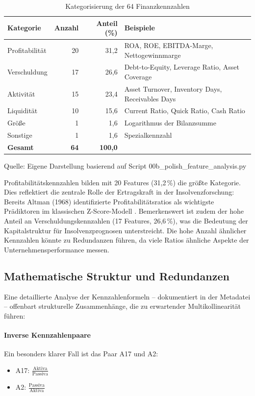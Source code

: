 \begin{table}[htbp]
\centering
\caption{Kategorisierung der 64 Finanzkennzahlen}
\label{tab:kategorien}
\begin{tabular}{lrrp{6cm}}
\toprule
\textbf{Kategorie} & \textbf{Anzahl} & \textbf{Anteil (\%)} & \textbf{Beispiele} \\
\midrule
Profitabilität & 20 & 31,2 & ROA, ROE, EBITDA-Marge, Nettogewinnmarge \\
Verschuldung & 17 & 26,6 & Debt-to-Equity, Leverage Ratio, Asset Coverage \\
Aktivität & 15 & 23,4 & Asset Turnover, Inventory Days, Receivables Days \\
Liquidität & 10 & 15,6 & Current Ratio, Quick Ratio, Cash Ratio \\
Größe & 1 & 1,6 & Logarithmus der Bilanzsumme \\
Sonstige & 1 & 1,6 & Spezialkennzahl \\
\midrule
\textbf{Gesamt} & \textbf{64} & \textbf{100,0} & \\
\bottomrule
\end{tabular}
\par\smallskip
{\footnotesize Quelle: Eigene Darstellung basierend auf Script 00b\_polish\_feature\_analysis.py}
\end{table}

Profitabilitätskennzahlen bilden mit 20 Features (31,2\,\%) die größte Kategorie. Dies reflektiert die zentrale Rolle der Ertragskraft in der Insolvenzforschung: Bereits Altman (1968) identifizierte Profitabilitätsratios als wichtigste Prädiktoren im klassischen Z-Score-Modell \parencite{altman1968financial}. Bemerkenswert ist zudem der hohe Anteil an Verschuldungskennzahlen (17 Features, 26,6\,\%), was die Bedeutung der Kapitalstruktur für Insolvenzprognosen unterstreicht. Die hohe Anzahl ähnlicher Kennzahlen könnte zu Redundanzen führen, da viele Ratios ähnliche Aspekte der Unternehmensperformance messen.

\subsection{Mathematische Struktur und Redundanzen}

Eine detaillierte Analyse der Kennzahlenformeln – dokumentiert in der Metadatei – offenbart strukturelle Zusammenhänge, die zu erwartender Multikollinearität führen:

\paragraph{Inverse Kennzahlenpaare}
Ein besonders klarer Fall ist das Paar A17 und A2:
\begin{itemize}[topsep=0.2\baselineskip]
    \item A17: $\frac{\text{Aktiva}}{\text{Passiva}}$
    \item A2: $\frac{\text{Passiva}}{\text{Aktiva}}$
\end{itemize}

